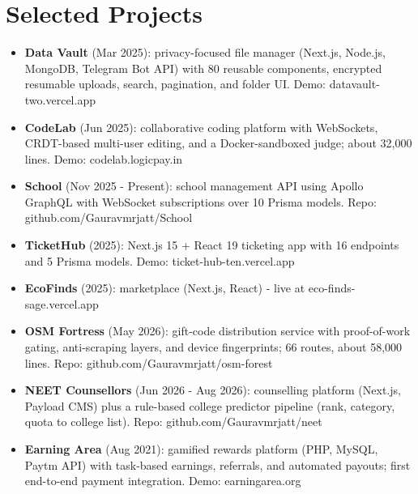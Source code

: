 \documentclass[11pt,a4paper,sans]{moderncv}
\begin{document}
\section{Selected Projects}
\vspace{1pt}
\begin{itemize}
    \item {\textbf{Data Vault} (Mar 2025): privacy-focused file manager (Next.js, Node.js, MongoDB, Telegram Bot API) with 80 reusable components, encrypted resumable uploads, search, pagination, and folder UI. Demo: datavault-two.vercel.app}
    \item {\textbf{CodeLab} (Jun 2025): collaborative coding platform with WebSockets, CRDT-based multi-user editing, and a Docker-sandboxed judge; about 32,000 lines. Demo: codelab.logicpay.in}
    \item {\textbf{School} (Nov 2025 - Present): school management API using Apollo GraphQL with WebSocket subscriptions over 10 Prisma models. Repo: github.com/Gauravmrjatt/School}
    \item {\textbf{TicketHub} (2025): Next.js 15 + React 19 ticketing app with 16 endpoints and 5 Prisma models. Demo: ticket-hub-ten.vercel.app}
    \item {\textbf{EcoFinds} (2025): marketplace (Next.js, React) - live at eco-finds-sage.vercel.app}
\item {\textbf{OSM Fortress} (May 2026): gift-code distribution service with proof-of-work gating, anti-scraping layers, and device fingerprints; 66 routes, about 58,000 lines. Repo: github.com/Gauravmrjatt/osm-forest}
\item {\textbf{NEET Counsellors} (Jun 2026 - Aug 2026): counselling platform (Next.js, Payload CMS) plus a rule-based college predictor pipeline (rank, category, quota to college list). Repo: github.com/Gauravmrjatt/neet}
\item {\textbf{Earning Area} (Aug 2021): gamified rewards platform (PHP, MySQL, Paytm API) with task-based earnings, referrals, and automated payouts; first end-to-end payment integration. Demo: earningarea.org}
\end{itemize}

\end{document}
